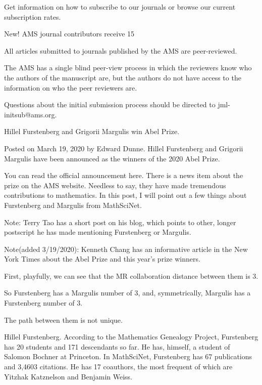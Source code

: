 Get information on how to subscribe to our journals or browse our current subscription rates.

New!
AMS journal contributors receive 15%

All articles submitted to journals published by the AMS are peer-reviewed.

The AMS has a single blind peer-view process in which the reviewers know who the authors of the manuscript are,
but the authors do not have access to the information on who the peer reviewers are.

Questions about the initial submission process should be directed to jml-initsub@ams.org.

\smallskip{}

\fi

Hillel Furstenberg and Grigorii Margulis win Abel Prize.

Posted on March 19, 2020 by Edward Dunne.
Hillel Furstenberg and Grigorii Margulis
have been announced as the winners of the 2020
Abel Prize.

You can read the official announcement here.
There is a news item about the prize on the AMS
website. Needless to say, they have made tremendous
contributions to mathematics.
In this post, I will point out a few things about Furstenberg
and Margulis from MathSciNet.

Note: Terry Tao has a short post on his blog,
which points to other, longer postscript he has made
mentioning Furstenberg or Margulis.

Note(added 3/19/2020): Kenneth Chang has an
informative article in the New York Times
about the Abel Prize and this year's prize
winners.

First, playfully, we can see that the MR
collaboration distance between them is 3.

So Furstenberg has a Margulis number of 3,
and, symmetrically, Margulis has a Furstenberg
number of 3.

The path between them is not unique.

Hillel Furstenberg. According to the
Mathematics Genealogy Project, Furstenberg
has 20 students and 171 descendants so far.
He has, himself, a student of Salomon Bochner
at Princeton. In MathSciNet, Furstenberg
has 67 publications and 3,4603 citations.
He has 17 coauthors, the most frequent of
which are Yitzhak Katznelson and
Benjamin Weiss.

